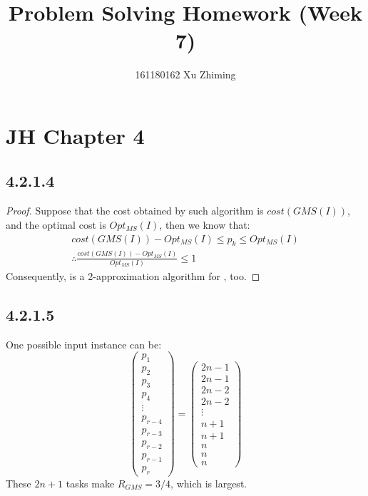 \documentclass[twocolumn, 10.5pt]{article}
\begin{document}
	\title{Problem Solving Homework (Week 7)}\author{161180162 Xu Zhiming}\maketitle
	\section*{JH Chapter 4}
	\subsection*{4.2.1.4}
	\begin{proof}
		Suppose that the cost obtained by such algorithm is $cost(GMS(I))$, and the optimal cost is $Opt_{MS}(I)$, then we know that:
		\[
		\begin{aligned}
			cost(GMS(I))-Opt_{MS}(I)\le p_k\le Opt_{MS}(I)\\
			\therefore \frac{cost(GMS(I))-Opt_{MS}(I)}{Opt_{MS}(I)}\le 1
		\end{aligned}
		\]
		Consequently,  is a 2-approximation algorithm for , too.
	\end{proof}
	\subsection*{4.2.1.5}
	One possible input instance can be:
	\[
	\begin{pmatrix}
		p_1\\
		p_2\\
		p_3\\
		p_4\\
		\vdots\\
		p_{r-4}\\
		p_{r-3}\\
		p_{r-2}\\
		p_{r-1}\\
		p_r
	\end{pmatrix}=
	\begin{pmatrix}
		2n-1\\
		2n-1\\
		2n-2\\
		2n-2\\
		\vdots\\
		n+1\\
		n+1\\
		n\\
		n\\
		n
	\end{pmatrix}
	\]
	These $2n+1$ tasks make $R_{GMS}=3/4$, which is largest.
\end{document}
